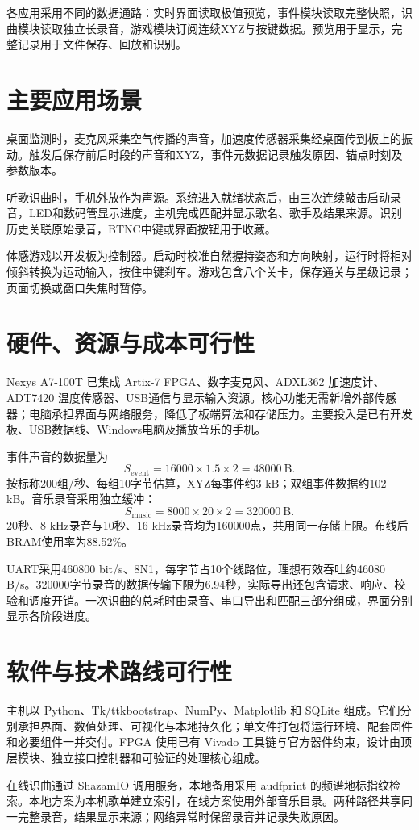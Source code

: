 各应用采用不同的数据通路：实时界面读取极值预览，事件模块读取完整快照，识曲模块读取独立长录音，游戏模块订阅连续XYZ与按键数据。预览用于显示，完整记录用于文件保存、回放和识别。

\section{主要应用场景}
桌面监测时，麦克风采集空气传播的声音，加速度传感器采集经桌面传到板上的振动。触发后保存前后时段的声音和XYZ，事件元数据记录触发原因、锚点时刻及参数版本。

听歌识曲时，手机外放作为声源。系统进入就绪状态后，由三次连续敲击启动录音，LED和数码管显示进度，主机完成匹配并显示歌名、歌手及结果来源。识别历史关联原始录音，BTNC中键或界面按钮用于收藏。

体感游戏以开发板为控制器。启动时校准自然握持姿态和方向映射，运行时将相对倾斜转换为运动输入，按住中键刹车。游戏包含八个关卡，保存通关与星级记录；页面切换或窗口失焦时暂停。

\section{硬件、资源与成本可行性}
Nexys A7-100T 已集成 Artix-7 FPGA、数字麦克风、ADXL362 加速度计、ADT7420 温度传感器、USB通信与显示输入资源\cite{rm}。核心功能无需新增外部传感器；电脑承担界面与网络服务，降低了板端算法和存储压力。主要投入是已有开发板、USB数据线、Windows电脑及播放音乐的手机。

事件声音的数据量为
\begin{equation}
 S_\mathrm{event}=16000\times1.5\times2=48000\ \mathrm{B}.
\end{equation}
按标称200组/秒、每组10字节估算，XYZ每事件约3 kB；双组事件数据约102 kB。音乐录音采用独立缓冲：
\begin{equation}
 S_\mathrm{music}=8000\times20\times2=320000\ \mathrm{B}.
\end{equation}
20秒、8 kHz录音与10秒、16 kHz录音均为160000点，共用同一存储上限。布线后BRAM使用率为88.52\%。

UART采用460800 bit/s、8N1，每字节占10个线路位，理想有效吞吐约46080 B/s。320000字节录音的数据传输下限为6.94秒，实际导出还包含请求、响应、校验和调度开销。一次识曲的总耗时由录音、串口导出和匹配三部分组成，界面分别显示各阶段进度。

\section{软件与技术路线可行性}
主机以 Python、Tk/ttkbootstrap、NumPy、Matplotlib 和 SQLite 组成。它们分别承担界面、数值处理、可视化与本地持久化；单文件打包将运行环境、配套固件和必要组件一并交付。FPGA 使用已有 Vivado 工具链与官方器件约束，设计由顶层模块、独立接口控制器和可验证的处理核心组成。

在线识曲通过 ShazamIO 调用服务，本地备用采用 audfprint 的频谱地标指纹检索\cite{shazamio,audfprint}。本地方案为本机歌单建立索引，在线方案使用外部音乐目录。两种路径共享同一完整录音，结果显示来源；网络异常时保留录音并记录失败原因。

